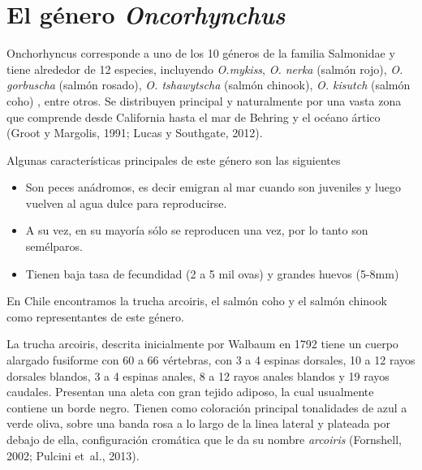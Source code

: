 \documentclass[12pt,letterpaper,oneside]{scrbook}
\begin{document}
\section{El género \emph{Oncorhynchus}}

Onchorhyncus corresponde a uno de los 10 géneros de la familia
Salmonidae y tiene alrededor de 12 especies, incluyendo \emph{O.mykiss},
\emph{O. nerka} (salmón rojo), \emph{O. gorbuscha} (salmón rosado),
\emph{O. tshawytscha} (salmón chinook), \emph{O. kisutch} (salmón coho)
, entre otros. Se distribuyen principal y naturalmente por una vasta
zona que comprende desde California hasta el mar de Behring y el océano
ártico (Groot y Margolis, 1991; Lucas y Southgate, 2012).

Algunas características principales de este género son las siguientes

\begin{itemize}
    \item Son peces anádromos, es decir emigran al mar cuando son juveniles y luego vuelven al agua dulce para reproducirse.
    \item A su vez, en su mayoría sólo se reproducen una vez, por lo tanto son semélparos.
    \item Tienen baja tasa de fecundidad (2 a 5 mil ovas) y grandes huevos (5-8mm)
\end{itemize}

En Chile encontramos la trucha arcoiris, el salmón coho y el salmón
chinook como representantes de este género.

La trucha arcoiris, descrita inicialmente por Walbaum en 1792 tiene un
cuerpo alargado fusiforme con 60 a 66 vértebras, con 3 a 4 espinas
dorsales, 10 a 12 rayos dorsales blandos, 3 a 4 espinas anales, 8 a 12
rayos anales blandos y 19 rayos caudales. Presentan una aleta con gran
tejido adiposo, la cual usualmente contiene un borde negro. Tienen como
coloración principal tonalidades de azul a verde oliva, sobre una banda
rosa a lo largo de la linea lateral y plateada por debajo de ella,
configuración cromática que le da su nombre \emph{arcoiris} (Fornshell,
2002; Pulcini et~al., 2013).
\end{document}
